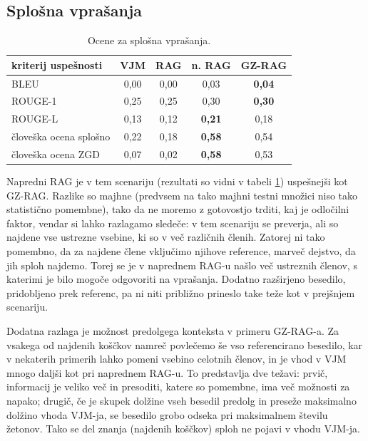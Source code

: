 \documentclass[a4paper,12pt,openright]{book}
\begin{document}
\subsection{Splošna vprašanja}

\begin{table}[H]
	\centering
	\caption{Ocene za splošna vprašanja.}
	\begin{tabular}{|l|c|c|c|c|}
		\hline
		kriterij uspešnosti    & VJM  & RAG  & n. RAG        & GZ-RAG        \\ \hline
		BLEU                   & 0,00 & 0,00 & 0,03          & \textbf{0,04} \\ \hline
		ROUGE-1                & 0,25 & 0,25 & 0,30          & \textbf{0,30} \\ \hline
		ROUGE-L                & 0,13 & 0,12 & \textbf{0,21} & 0,18          \\ \hline
		človeška ocena splošno & 0,22 & 0,18 & \textbf{0,58} & 0,54          \\ \hline
		človeška ocena ZGD     & 0,07 & 0,02 & \textbf{0,58} & 0,53          \\ \hline
	\end{tabular}
	\label{rez3}
\end{table}

Napredni RAG je v tem scenariju (rezultati so vidni v tabeli \ref{rez3}) uspešnejši kot GZ-RAG. Razlike so majhne (predvsem na tako majhni testni množici niso tako statistično pomembne), tako da ne moremo z gotovostjo trditi, kaj je odločilni faktor, vendar si lahko razlagamo sledeče: v tem scenariju se preverja, ali so najdene vse ustrezne vsebine, ki so v več različnih členih. Zatorej ni tako pomembno, da za najdene člene vključimo njihove reference, marveč dejstvo, da jih sploh najdemo. Torej se je v naprednem RAG-u našlo več ustreznih členov, s katerimi je bilo mogoče odgovoriti na vprašanja. Dodatno razširjeno besedilo, pridobljeno prek referenc, pa ni niti približno prineslo take teže kot v prejšnjem scenariju.

Dodatna razlaga je možnost predolgega konteksta v primeru GZ-RAG-a. Za vsakega od najdenih koščkov namreč povlečemo še vso referencirano besedilo, kar v nekaterih primerih lahko pomeni vsebino celotnih členov, in je vhod v VJM mnogo daljši kot pri naprednem RAG-u. To predstavlja dve težavi: prvič, informacij je veliko več in presoditi, katere so pomembne, ima več možnosti za napako; drugič, če je skupek dolžine vseh besedil predolg in preseže maksimalno dolžino vhoda VJM-ja, se besedilo grobo odseka pri maksimalnem številu žetonov. Tako se del znanja (najdenih koščkov) sploh ne pojavi v vhodu VJM-ja.
\end{document}
